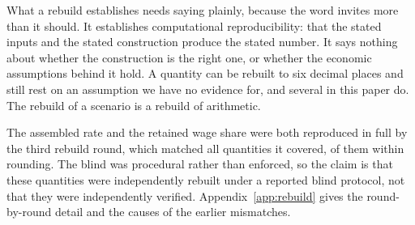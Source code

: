 What a rebuild establishes needs saying plainly, because the word invites more than it should. It
establishes computational reproducibility: that the stated inputs and the stated construction
produce the stated number. It says nothing about whether the construction is the right one, or
whether the economic assumptions behind it hold. A quantity can be rebuilt to six decimal places
and still rest on an assumption we have no evidence for, and several in this paper do. The
rebuild of a scenario is a rebuild of arithmetic.

The assembled rate and the retained wage share were both reproduced in full by the third rebuild
round, which matched all  quantities it covered,
 of them within rounding. The blind was procedural rather than enforced,
so the claim is that these quantities were independently rebuilt under a reported blind protocol,
not that they were independently verified. Appendix~\ref{app:rebuild} gives the round-by-round
detail and the causes of the earlier mismatches.
